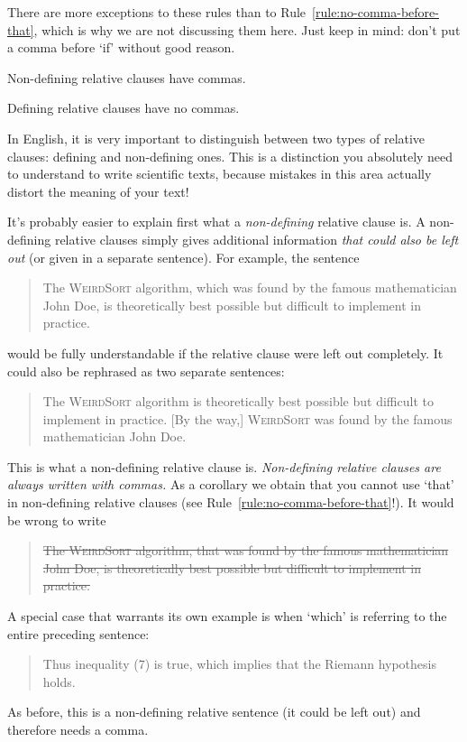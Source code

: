 There are more exceptions to these rules than to
Rule~\ref{rule:no-comma-before-that}, which is why we are not
discussing them here. Just keep in mind: don't put a comma before `if'
without good reason.

\begin{Rule}
  \label{rule:non-defining-has-comma}
  Non-defining relative clauses have commas.
\end{Rule}
\begin{Rule}
  \label{rule:defining-without-comma}
  Defining relative clauses have no commas.
\end{Rule}

In English, it is very important to distinguish between two types of
relative clauses: defining and non-defining ones. This is a
distinction you absolutely need to understand to write scientific
texts, because mistakes in this area actually distort the meaning of
your text!

It's probably easier to explain first what a \emph{non-defining}
relative clause is. A non-defining relative clauses simply gives
additional information \emph{that could also be left out} (or given in
a separate sentence). For example, the sentence
\begin{quote}
  The \textsc{WeirdSort} algorithm, which was found by the famous
  mathematician John Doe, is theoretically best possible but difficult
  to implement in practice.
\end{quote}
would be fully understandable if the relative clause were left out
completely. It could also be rephrased as two separate sentences:
\begin{quote}
  The \textsc{WeirdSort} algorithm is theoretically best possible but
  difficult to implement in practice. [By the way,] \textsc{WeirdSort}
  was found by the famous mathematician John Doe.
\end{quote}
This is what a non-defining relative clause is. \emph{Non-defining
  relative clauses are always written with commas.} As a corollary we
obtain that you cannot use `that' in non-defining relative clauses
(see Rule~\ref{rule:no-comma-before-that}!). It would be wrong to
write
\begin{quote}
  \st{The \textsc{WeirdSort} algorithm, that was found by the famous
    mathematician John Doe, is theoretically best possible but
    difficult to implement in practice.}
\end{quote}
A special case that warrants its own example is when `which' is
referring to the entire preceding sentence:
\begin{quote}
  Thus inequality (7) is true, which implies that the Riemann
  hypothesis holds.
\end{quote}
As before, this is a non-defining relative sentence (it could be left
out) and therefore needs a comma.

